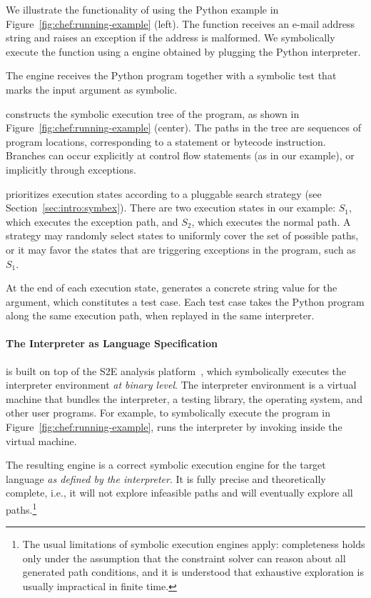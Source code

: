 We illustrate the functionality of \chef using the Python example in Figure~\ref{fig:chef:running-example} (left).
%
The function  receives an e-mail address string and raises an exception if the address is malformed.
%
We symbolically execute the function using a \chef engine obtained by plugging the Python interpreter.

The \chef engine receives the Python program together with a symbolic test that marks the  input argument as symbolic.

\chef constructs the symbolic execution tree of the program, as shown in Figure~\ref{fig:chef:running-example} (center).
%
The paths in the tree are sequences of program locations, corresponding to a statement or bytecode instruction.  Branches can occur explicitly at control flow statements (as in our example), or implicitly through exceptions.

\chef prioritizes execution states according to a pluggable search strategy (see Section~\ref{sec:intro:symbex}).
%
There are two execution states in our example: $S_1$, which executes the exception path, and $S_2$, which executes the normal path.
%
A strategy may randomly select states to uniformly cover the set of possible paths, or it may favor the states that are triggering exceptions in the program, such as $S_1$.

At the end of each execution state, \chef generates a concrete string value for the  argument, which constitutes a test case.
%
Each test case takes the Python program along the same execution path, when replayed in the same interpreter.


\paragraph{The Interpreter as Language Specification}

\chef is built on top of the S2E analysis platform~\cite{s2eSystem}, which symbolically executes the interpreter environment \emph{at binary level}.
%
The interpreter environment is a virtual machine that bundles the interpreter, a testing library, the operating system, and other user programs.
%
For example, to symbolically execute the program in Figure~\ref{fig:chef:running-example},  \chef runs the interpreter by invoking  inside the virtual machine.

The resulting engine is a correct symbolic execution engine for the target language \emph{as defined by the interpreter}.
%
It is fully precise and theoretically complete, i.e., it will not explore infeasible paths and will eventually explore all paths.\footnote{The usual limitations of symbolic execution engines apply: completeness holds only under the assumption that the constraint solver can reason about all generated path conditions, and it is understood that exhaustive exploration is usually impractical in finite time.}

